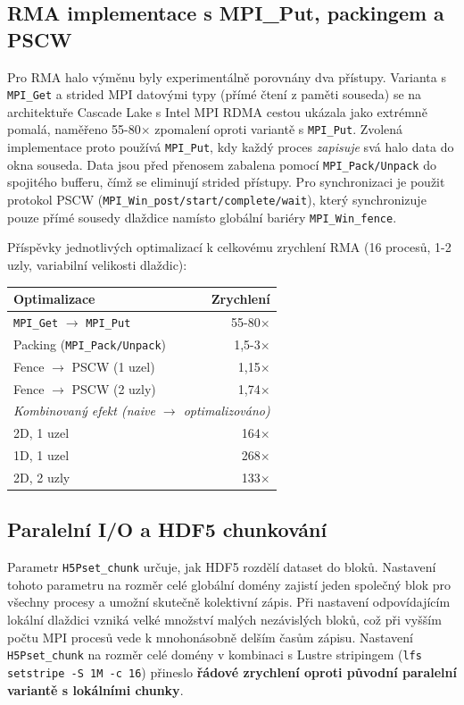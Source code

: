 \documentclass{article}
\begin{document}
\subsection*{RMA implementace s MPI\_Put, packingem a PSCW}
Pro RMA halo výměnu byly experimentálně porovnány dva přístupy.
Varianta s \texttt{MPI\_Get} a strided MPI datovými typy (přímé čtení
z paměti souseda) se na architektuře Cascade Lake s Intel MPI RDMA
cestou ukázala jako extrémně pomalá, naměřeno 55-80$\times$ zpomalení
oproti variantě s \texttt{MPI\_Put}.
Zvolená implementace proto používá \texttt{MPI\_Put}, kdy každý proces
\emph{zapisuje} svá halo data do okna souseda.
Data jsou před přenosem zabalena pomocí \texttt{MPI\_Pack/Unpack}
do spojitého bufferu, čímž se eliminují strided přístupy.
Pro synchronizaci je použit protokol PSCW
(\texttt{MPI\_Win\_post/start/complete/wait}), který synchronizuje pouze
přímé sousedy dlaždice namísto globální bariéry \texttt{MPI\_Win\_fence}.

Příspěvky jednotlivých optimalizací k celkovému zrychlení RMA
(16 procesů, 1-2 uzly, variabilní velikosti dlaždic):

\begin{center}
\begin{tabular}{lr}
\toprule
Optimalizace & Zrychlení \\
\midrule
\texttt{MPI\_Get} $\to$ \texttt{MPI\_Put} & 55-80$\times$ \\
Packing (\texttt{MPI\_Pack/Unpack})        & 1{,}5-3$\times$ \\
Fence $\to$ PSCW (1 uzel)                 & 1{,}15$\times$ \\
Fence $\to$ PSCW (2 uzly)                 & 1{,}74$\times$ \\
\midrule
\multicolumn{2}{l}{\textit{Kombinovaný efekt (naive $\to$ optimalizováno)}} \\
\quad 2D, 1 uzel & 164$\times$ \\
\quad 1D, 1 uzel & 268$\times$ \\
\quad 2D, 2 uzly & 133$\times$ \\
\bottomrule
\end{tabular}
\end{center}

\subsection*{Paralelní I/O a HDF5 chunkování}
Parametr \texttt{H5Pset\_chunk} určuje, jak HDF5 rozdělí dataset do bloků.
Nastavení tohoto parametru na rozměr celé globální domény zajistí
jeden společný blok pro všechny procesy a umožní skutečně kolektivní zápis.
Při nastavení odpovídajícím lokální dlaždici vzniká velké množství malých
nezávislých bloků, což při vyšším počtu MPI procesů vede k mnohonásobně
delším časům zápisu. Nastavení \texttt{H5Pset\_chunk} na rozměr celé domény
v kombinaci s Lustre stripingem (\texttt{lfs setstripe -S 1M -c 16})
přineslo \textbf{řádové zrychlení oproti původní paralelní variantě
s lokálními chunky}.
\end{document}

